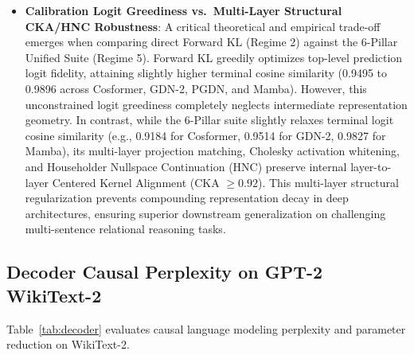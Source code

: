 \documentclass{article}
\begin{document}
\begin{itemize}
    \item \textbf{Calibration Logit Greediness vs.\ Multi-Layer Structural CKA/HNC Robustness}: A critical theoretical and empirical trade-off emerges when comparing direct Forward KL (Regime 2) against the 6-Pillar Unified Suite (Regime 5). Forward KL greedily optimizes top-level prediction logit fidelity, attaining slightly higher terminal cosine similarity (0.9495 to 0.9896 across Cosformer, GDN-2, PGDN, and Mamba). However, this unconstrained logit greediness completely neglects intermediate representation geometry. In contrast, while the 6-Pillar suite slightly relaxes terminal logit cosine similarity (e.g., 0.9184 for Cosformer, 0.9514 for GDN-2, 0.9827 for Mamba), its multi-layer projection matching, Cholesky activation whitening, and Householder Nullspace Continuation (HNC) preserve internal layer-to-layer Centered Kernel Alignment (CKA $\ge 0.92$). This multi-layer structural regularization prevents compounding representation decay in deep architectures, ensuring superior downstream generalization on challenging multi-sentence relational reasoning tasks.
\end{itemize}

\subsection{Decoder Causal Perplexity on GPT-2 WikiText-2}
Table~\ref{tab:decoder} evaluates causal language modeling perplexity and parameter reduction on WikiText-2.


\end{document}
